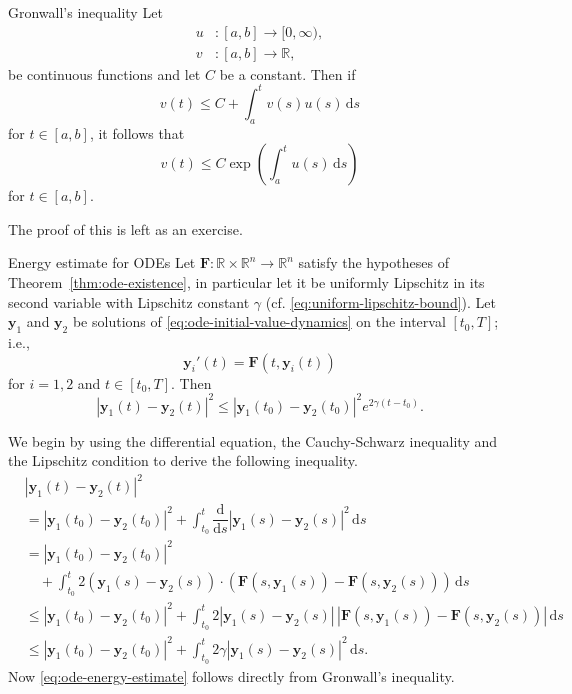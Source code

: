 \begin{Lemma}{Gronwall's inequality}
\label{lem:gronwall}
Let
\[
\begin{aligned}u&:[a,b]\to[0,\infty),\\v&:[a,b]\to\mathbb{R},\end{aligned}
\]
be continuous functions and let $C$ be a constant. Then if
\begin{equation}\label{eq:gronwall-integral-hypothesis}
v(t)\leq C+\int_a^tv(s)u(s)\,\mathrm{d}s
\end{equation}
for $t\in[a,b]$, it follows that
\begin{equation}\label{eq:gronwall-exponential-bound}
v(t)\leq C\exp\left(\int_a^tu(s)\,\mathrm{d}s\right)
\end{equation}
for $t\in[a,b]$.
\end{Lemma}

The proof of this is left as an exercise.

\begin{Lemma}{Energy estimate for ODEs}
\label{lem:ode-energy-estimate}
Let $\bm{F}:\mathbb{R}\times\mathbb{R}^n\to\mathbb{R}^n$ satisfy the hypotheses of Theorem~\ref{thm:ode-existence}, in particular let it be uniformly Lipschitz in its second variable with Lipschitz constant $\gamma$ (cf. \eqref{eq:uniform-lipschitz-bound}). Let $\bm{y}_1$ and $\bm{y}_2$ be solutions of \eqref{eq:ode-initial-value-dynamics} on the interval $[t_0,T]$; i.e.,
\[
\bm{y}_i'(t)=\bm{F}(t,\bm{y}_i(t))
\]
for $i=1,2$ and $t\in[t_0,T]$. Then
\begin{equation}\label{eq:ode-energy-estimate}
|\bm{y}_1(t)-\bm{y}_2(t)|^2\leq|\bm{y}_1(t_0)-\bm{y}_2(t_0)|^2e^{2\gamma(t-t_0)}.
\end{equation}

\end{Lemma}

\begin{Proof}
We begin by using the differential equation, the Cauchy-Schwarz inequality and the Lipschitz condition to derive the following inequality.
\[
\begin{aligned}
&|\bm{y}_1(t)-\bm{y}_2(t)|^2\\
&=|\bm{y}_1(t_0)-\bm{y}_2(t_0)|^2+\int_{t_0}^t\dfrac{\mathrm{d}}{\mathrm{d}s}|\bm{y}_1(s)-\bm{y}_2(s)|^2\,\mathrm{d}s\\
&=|\bm{y}_1(t_0)-\bm{y}_2(t_0)|^2\\
&\quad+\int_{t_0}^t2(\bm{y}_1(s)-\bm{y}_2(s))\cdot(\bm{F}(s,\bm{y}_1(s))-\bm{F}(s,\bm{y}_2(s)))\,\mathrm{d}s\\
&\leq|\bm{y}_1(t_0)-\bm{y}_2(t_0)|^2+\int_{t_0}^t2|\bm{y}_1(s)-\bm{y}_2(s)|\,|\bm{F}(s,\bm{y}_1(s))-\bm{F}(s,\bm{y}_2(s))|\,\mathrm{d}s\\
&\leq|\bm{y}_1(t_0)-\bm{y}_2(t_0)|^2+\int_{t_0}^t2\gamma|\bm{y}_1(s)-\bm{y}_2(s)|^2\,\mathrm{d}s.
\end{aligned}
\]
Now \eqref{eq:ode-energy-estimate} follows directly from Gronwall's inequality.
\end{Proof}

